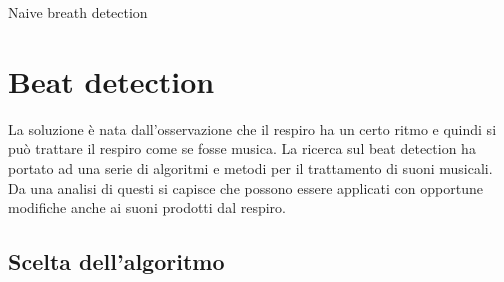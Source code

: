 \incmargin{1em}
\linesnumbered
\begin{algorithm}
  \dontprintsemicolon
  \SetVline
  \caption{Naive breath detection}

    \BlankLine

\label{algoritmoElementare}
\end{algorithm}
\decmargin{1em}





\section{Beat detection}
La soluzione \`e nata dall'osservazione che il respiro ha un certo ritmo e quindi si pu\`o trattare il respiro come se fosse musica. 
La ricerca sul beat detection ha portato ad una serie di algoritmi e metodi per il trattamento di suoni musicali. 
Da una analisi di questi si capisce che possono essere applicati con opportune modifiche anche ai suoni prodotti dal respiro.




\subsection{Scelta dell'algoritmo}

